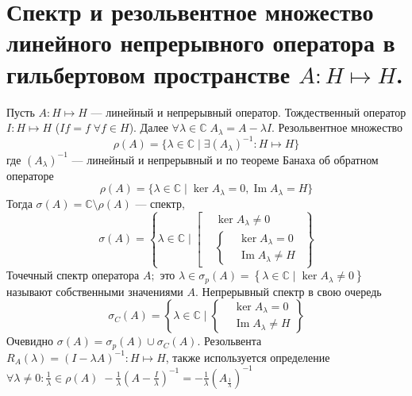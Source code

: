 \documentclass[12pt]{article}
\renewcommand{\Im}{\operatorname{Im}}
\newcommand{\Al}{A_\lambda}
\newcommand{\Alo}{(\Al)^{-1}}
\newcommand{\Rez}{(I - \lambda A)^{-1}}
\begin{document}
\newtheorem{Theor}{Теорема}
\newtheorem{Opr}{Определение}
\newtheorem{Upr}{Упражнение}
\newtheorem{Nabl}{Наблюдение}
\newtheorem{Zam}{Замечание}
\section*{Спектр и резольвентное множество линейного непрерывного оператора в гильбертовом пространстве $A : H \mapsto H$.}
Пусть $A : H \mapsto H$ --- линейный и непрерывный оператор.
Тождественный оператор $I : H \mapsto H$ ($If = f\;\forall f \in H$).
Далее $\forall \lambda \in \mathbb C\;A_\lambda = A - \lambda I$.
Резольвентное множество
$$
\rho(A) = \{ \lambda \in \mathbb C \mid \exists (A_\lambda)^{-1} : H \mapsto H \}
$$
где $\Alo$ --- линейный и непрерывный и по теореме Банаха об обратном операторе
$$
\rho(A) = \{ \lambda \in \mathbb C \mid \ker A_\lambda = 0, \Im A_\lambda = H \}
$$
Тогда $\sigma(A) = \mathbb C \setminus \rho(A)$ --- спектр, 
$$
\sigma(A) = \left \{ \lambda \in \mathbb C \mid 
\left [
    \begin{aligned}
        &\ker A_\lambda \ne 0\\
        &\left \{
            \begin{aligned}
                &\ker \Al = 0\\
                &\Im \Al \ne H
            \end{aligned}
            \right.
    \end{aligned}
\right.\right\}
$$
Точечный спектр оператора $A;$ это $\lambda \in \sigma_p(A)= \left \{ \lambda \in \mathbb C \mid \ker A_\lambda \ne 0 \right\}$ называют собственными значениями $A$.
Непрерывный спектр в свою очередь 
$$\sigma_C(A) =  \left \{ \lambda \in \mathbb C \mid 
\left\{
    \begin{aligned}
                &\ker \Al = 0\\
                &\Im \Al \ne H
    \end{aligned}
\right.\right \}
$$
Очевидно $\sigma(A) = \sigma_p(A) \cup \sigma_C(A)$.
Резольвента $R_A(\lambda) = \Rez : H \mapsto H$, также используется определение
$\forall \lambda \ne 0\colon \frac{1}{\lambda} \in \rho(A)\;-\frac{1}{\lambda}(A - \frac{I}{\lambda})^{-1} = -\frac{1}{\lambda}(A_{\frac1{\lambda}})^{-1}$
\end{document}
